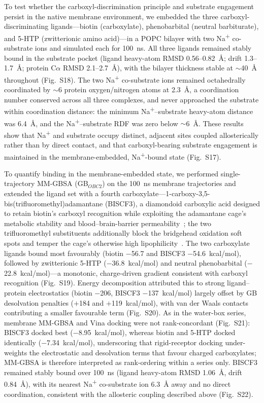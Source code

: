 \documentclass[10pt,letterpaper]{article}
\begin{document}
To test whether the carboxyl-discrimination principle and substrate engagement persist in the native membrane environment, we embedded the three carboxyl-discriminating ligands---biotin (carboxylate), phenobarbital (neutral barbiturate), and 5-HTP (zwitterionic amino acid)---in a POPC bilayer with two Na\textsuperscript{+} co-substrate ions and simulated each for 100~ns. All three ligands remained stably bound in the substrate pocket (ligand heavy-atom RMSD 0.56--0.82~\AA{}; drift 1.3--1.7~\AA{}; protein C$\alpha$ RMSD 2.1--2.7~\AA{}), with the bilayer thickness stable at $\sim$40~\AA{} throughout (Fig.~S18). The two Na\textsuperscript{+} co-substrate ions remained octahedrally coordinated by $\sim$6 protein oxygen/nitrogen atoms at 2.3~\AA{}, a coordination number conserved across all three complexes, and never approached the substrate within coordination distance: the minimum Na\textsuperscript{+}--substrate heavy-atom distance was 6.4~\AA{}, and the Na\textsuperscript{+}--substrate RDF was zero below $\sim$6~\AA{}. These results show that Na\textsuperscript{+} and substrate occupy distinct, adjacent sites coupled allosterically rather than by direct contact, and that carboxyl-bearing substrate engagement is maintained in the membrane-embedded, Na\textsuperscript{+}-bound state (Fig.~S17).

To quantify binding in the membrane-embedded state, we performed single-trajectory MM-GBSA (GB$_{OBC2}$) on the 100~ns membrane trajectories and extended the ligand set with a fourth carboxylate---1-carboxy-3,5-bis(trifluoromethyl)adamantane (BISCF3), a diamondoid carboxylic acid designed to retain biotin's carboxyl recognition while exploiting the adamantane cage's metabolic stability and blood--brain-barrier permeability~\cite{wanka2013}; the two trifluoromethyl substituents additionally block the bridgehead oxidation soft spots and temper the cage's otherwise high lipophilicity~\cite{dane2025}. The two carboxylate ligands bound most favourably (biotin $-$56.7 and BISCF3 $-$54.6~kcal/mol), followed by zwitterionic 5-HTP ($-$36.8~kcal/mol) and neutral phenobarbital ($-$22.8~kcal/mol)---a monotonic, charge-driven gradient consistent with carboxyl recognition (Fig.~S19). Energy decomposition attributed this to strong ligand--protein electrostatics (biotin $-$206, BISCF3 $-$137~kcal/mol) largely offset by GB desolvation penalties ($+$184 and $+$119~kcal/mol), with van der Waals contacts contributing a smaller favourable term (Fig.~S20). As in the water-box series, membrane MM-GBSA and Vina docking were not rank-concordant (Fig.~S21): BISCF3 docked best ($-$8.95~kcal/mol), whereas biotin and 5-HTP docked identically ($-$7.34~kcal/mol), underscoring that rigid-receptor docking under-weights the electrostatic and desolvation terms that favour charged carboxylates; MM-GBSA is therefore interpreted as rank-ordering within a series only. BISCF3 remained stably bound over 100~ns (ligand heavy-atom RMSD 1.06~\AA{}, drift 0.84~\AA{}), with its nearest Na\textsuperscript{+} co-substrate ion 6.3~\AA{} away and no direct coordination, consistent with the allosteric coupling described above (Fig.~S22).
\end{document}
